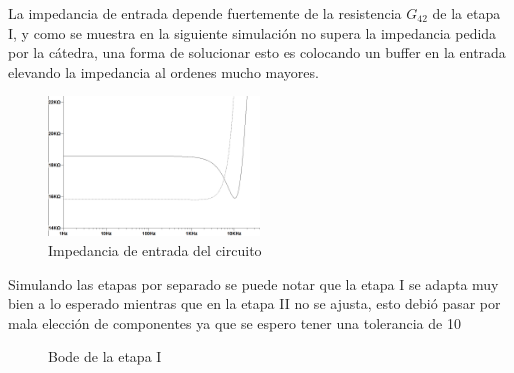 La impedancia de entrada depende fuertemente de la resistencia $G_{42}$ de la etapa I, y como se muestra en la siguiente simulación no supera la impedancia pedida por la cátedra, una forma de solucionar esto es colocando un buffer en la entrada elevando la impedancia al ordenes mucho mayores.

\begin{figure}[h!]
	\includegraphics[width=0.5\textwidth]{../Ejercicio2-DisenoDeCeldas/3CeldaSedra/Imagenes/MagImpedancia.png}
	\centering
	\caption{Impedancia de entrada del circuito}
\end{figure}


Simulando las etapas por separado se puede notar que la etapa I se adapta muy bien a lo esperado mientras que en la etapa II no se ajusta, esto debió pasar por mala elección de componentes ya que se espero tener una tolerancia de 10%

\begin{figure}[h!]
 \centering
 \caption{Bode de la etapa I}
 \label{f:etapaIbode}
\end{figure}

